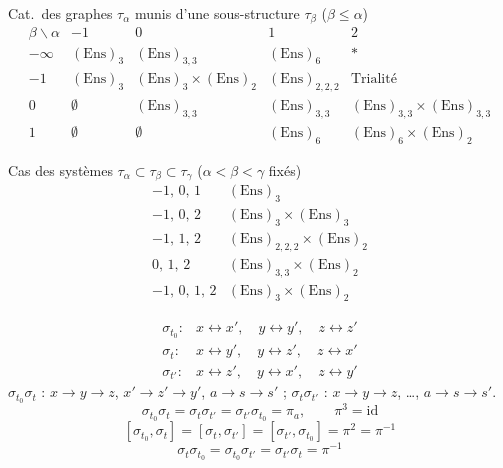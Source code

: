 \documentclass[11pt,a4paper]{article}
\begin{document}
Cat.\ des graphes $\tau_\alpha$ munis d'une sous-structure $\tau_\beta$ ($\beta \leq \alpha$)
\[
\begin{array}{c|c|c|c|c}
\beta \backslash \alpha & -1 & 0 & 1 & 2 \\ \hline
-\infty & (\mathrm{Ens})_3 & (\mathrm{Ens})_{3,3} & (\mathrm{Ens})_6 & * \\
-1 & (\mathrm{Ens})_3 & (\mathrm{Ens})_3 \times (\mathrm{Ens})_2 & (\mathrm{Ens})_{2,2,2} & \text{Trialité} \\
0 & \emptyset & (\mathrm{Ens})_{3,3} & (\mathrm{Ens})_{3,3} & (\mathrm{Ens})_{3,3} \times (\mathrm{Ens})_{3,3} \\
1 & \emptyset & \emptyset & (\mathrm{Ens})_6 & (\mathrm{Ens})_6 \times (\mathrm{Ens})_2
\end{array}
\]

Cas des systèmes $\tau_\alpha \subset \tau_\beta \subset \tau_\gamma$ ($\alpha < \beta < \gamma$ fixés)
\[
\begin{array}{c|c}
-1,\,0,\,1 & (\mathrm{Ens})_3 \\
-1,\,0,\,2 & (\mathrm{Ens})_3 \times (\mathrm{Ens})_3 \\
-1,\,1,\,2 & (\mathrm{Ens})_{2,2,2} \times (\mathrm{Ens})_2 \\
0,\,1,\,2 & (\mathrm{Ens})_{3,3} \times (\mathrm{Ens})_2 \\
-1,\,0,\,1,\,2 & (\mathrm{Ens})_3 \times (\mathrm{Ens})_2
\end{array}
\]

\[
\begin{array}{lll}
\sigma_{t_0} : & x \leftrightarrow x', \quad y \leftrightarrow y', \quad z \leftrightarrow z' \\
\sigma_t : & x \leftrightarrow y', \quad y \leftrightarrow z', \quad z \leftrightarrow x' \\
\sigma_{t'} : & x \leftrightarrow z', \quad y \leftrightarrow x', \quad z \leftrightarrow y'
\end{array}
\]
$\sigma_{t_0}\sigma_t$ : $x \to y \to z$, $x' \to z' \to y'$, $a \to s \to s'$ ; \quad
$\sigma_t\sigma_{t'}$ : $x \to y \to z$, \ldots, $a \to s \to s'$.
\[
\sigma_{t_0}\sigma_t = \sigma_t\sigma_{t'} = \sigma_{t'}\sigma_{t_0} = \pi_a, \qquad \pi^3 = \mathrm{id}
\]
\[
[\sigma_{t_0},\sigma_t] = [\sigma_t,\sigma_{t'}] = [\sigma_{t'},\sigma_{t_0}] = \pi^2 = \pi^{-1}
\]
\[
\sigma_t\sigma_{t_0} = \sigma_{t_0}\sigma_{t'} = \sigma_{t'}\sigma_t = \pi^{-1}
\]
\end{document}
